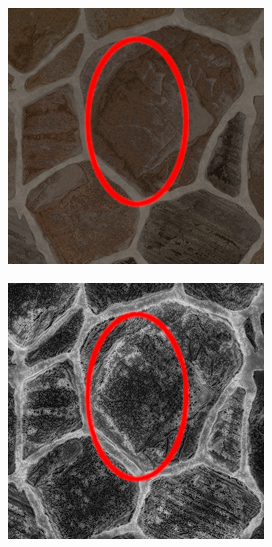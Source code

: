 
\begin{figure}
    \centering
    \begin{subfigure}{.45\textwidth}
        \centering
        \includegraphics[width=\textwidth]{contenu/resources/images/stone_zoom}
    \end{subfigure}
    \hfill
    \begin{subfigure}{.45\textwidth}
        \centering
        \includegraphics[width=\textwidth]{contenu/resources/images/stone_zoom_pc}
    \end{subfigure}


\end{figure}
